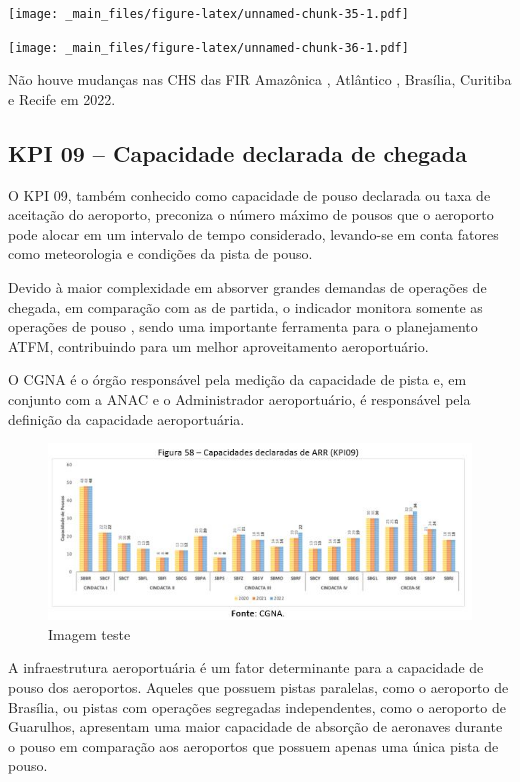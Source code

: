 \documentclass[
]{book}
\begin{document}
\texttt{[image: \_main\_files/figure-latex/unnamed-chunk-35-1.pdf]}

\texttt{[image: \_main\_files/figure-latex/unnamed-chunk-36-1.pdf]}

Não houve mudanças nas CHS das FIR Amazônica , Atlântico , Brasília, Curitiba e Recife em 2022.

\hypertarget{kpi-09-capacidade-declarada-de-chegada}{%
\subsection{KPI 09 -- Capacidade declarada de chegada}\label{kpi-09-capacidade-declarada-de-chegada}}

O KPI 09, também conhecido como capacidade de pouso declarada ou taxa de aceitação do aeroporto, preconiza o número máximo de pousos que o aeroporto pode alocar em um intervalo de tempo considerado, levando-se em conta fatores como meteorologia e condições da pista de pouso.

Devido à maior complexidade em absorver grandes demandas de operações de chegada, em comparação com as de partida, o indicador monitora somente as operações de pouso , sendo uma importante ferramenta para o planejamento ATFM, contribuindo para um melhor aproveitamento aeroportuário.

O CGNA é o órgão responsável pela medição da capacidade de pista e, em conjunto com a ANAC e o Administrador aeroportuário, é responsável pela definição da capacidade aeroportuária.

\begin{figure}
\centering
\includegraphics{imagens/fig47.jpg}
\caption{Imagem teste}
\end{figure}

A infraestrutura aeroportuária é um fator determinante para a capacidade de pouso dos aeroportos. Aqueles que possuem pistas paralelas, como o aeroporto de Brasília, ou pistas com operações segregadas independentes, como o aeroporto de Guarulhos, apresentam uma maior capacidade de absorção de aeronaves durante o pouso em comparação aos aeroportos que possuem apenas uma única pista de pouso.
\end{document}
